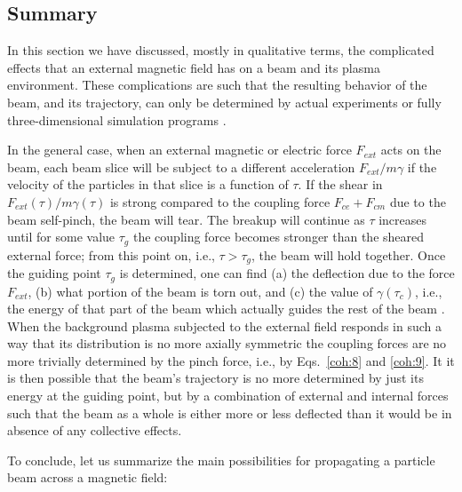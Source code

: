 \documentclass [12pt,a4paper,     ]{report} %
\begin{document}
\subsection{Summary}

   In this section we have discussed, mostly in qualitative terms, the complicated effects that an external magnetic field has on a beam and its plasma environment.  These complications are such that the resulting behavior of the beam, and its trajectory, can only be determined by actual experiments or fully three-dimensional simulation programs \cite{HUI--1984A}.

   In the general case, when an external magnetic or electric force $F_{ext}$ acts on the beam, each beam slice will be subject to a different acceleration $F_{ext}/m\gamma$ if the velocity of the particles in that slice is a function of $\tau$.  If the shear in $F_{ext}(\tau)/m\gamma(\tau)$ is strong compared to the coupling force $F_{ce} + F_{cm}$ due to the beam self-pinch, the beam will tear.  The breakup will continue as $\tau$ increases until for some value $\tau_g$ the coupling force becomes stronger than the sheared external force; from this point on, i.e., $\tau > \tau_g$, the beam will hold together.  Once the guiding point $\tau_g$ is determined, one can find (a) the deflection due to the force $F_{ext}$, (b) what portion of the beam is torn out, and (c) the value of $\gamma(\tau_c)$, i.e., the energy of that part of the beam which actually guides the rest of the beam \cite{HUI--1984A}.  When the background plasma subjected to the external field responds in such a way that its distribution is no more axially symmetric the coupling forces are no more trivially determined by the pinch force, i.e., by Eqs.~\eqref{coh:8} and \eqref{coh:9}.  It it is then possible that the beam's trajectory is no more determined by just its energy at the guiding point, but by a combination of external and internal forces such that the beam as a whole is either more or less deflected than it would be in absence of any collective effects. 

   To conclude, let us summarize the main possibilities for propagating a particle beam across a magnetic field:
\end{document}
